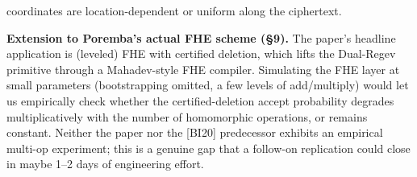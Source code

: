 \begin{description}
coordinates are location-dependent or uniform along the ciphertext.
\item[Q5.] \textbf{Extension to Poremba's actual FHE scheme (\S9).} The
paper's headline application is (leveled) FHE with certified deletion,
which lifts the Dual-Regev primitive through a Mahadev-style FHE compiler.
Simulating the FHE layer at small parameters (bootstrapping omitted, a
few levels of add/multiply) would let us empirically check whether the
certified-deletion accept probability degrades multiplicatively with the
number of homomorphic operations, or remains constant. Neither the paper
nor the [BI20] predecessor exhibits an empirical multi-op experiment;
this is a genuine gap that a follow-on replication could close in maybe
1--2 days of engineering effort.
\end{description}
